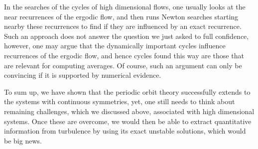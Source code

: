 In the searches of the cycles of high dimensional flows, one usually looks at
the near recurrences of the ergodic flow, and then runs Newton searches 
starting nearby these recurrences to find if they are influenced by an exact 
recurrence. Such an approach does not answer the question we just asked to full 
confidence, however, one may argue that the dynamically important cycles 
influence recurrences of the ergodic flow, and hence cycles found this way are 
those that are relevant for computing averages. Of course, such an argument can 
only be convincing if it is supported by numerical evidence.

To sum up, we have shown that the periodic orbit theory successfully extends to
the systems with continuous symmetries, yet, one still needs to think about 
remaining challenges, which we discussed above, associated with high 
dimensional systems. Once these are overcome, we would then be able to extract 
quantitative information from turbulence by using its exact unstable solutions, 
which would be big news.
